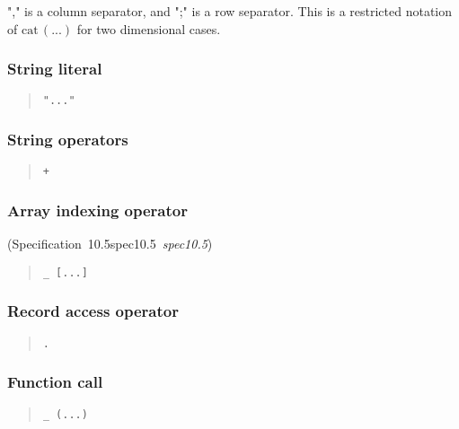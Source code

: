\documentclass[10pt,b5paper]{article}
\def\specrefx#1#2{Specification~#1\ifx\relax#2\relax{}\else~{\it{}#2}\fi}
\def\specref#1{\specrefx{#1}{\csname spec#1\endcsname}}
\begin{document}
\noindent "," is a column separator, and ";" is a row separator.  This
is a restricted notation of $\mathrm{cat}\,(...)$ for two dimensional
cases.

\subsubsection*{String literal}

\begin{quote}
\begin{verbatim}
"..."
\end{verbatim}
\end{quote}

\subsubsection*{String operators}

\begin{quote}
\begin{verbatim}
+
\end{verbatim}
\end{quote}

\subsubsection*{Array indexing operator}
(\specref{10.5}\/)

\begin{quote}
\begin{verbatim}
_ [...]
\end{verbatim}
\end{quote}

\subsubsection*{Record access operator}

\begin{quote}
\begin{verbatim}
.
\end{verbatim}
\end{quote}

\subsubsection*{Function call}

\begin{quote}
\begin{verbatim}
_ (...)
\end{verbatim}
\end{quote}
\end{document}
